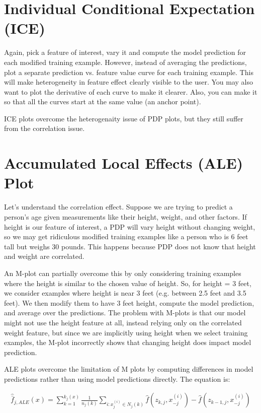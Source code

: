 \documentclass[a4paper]{article}
\begin{document}
\section{Individual Conditional Expectation (ICE)}
Again, pick a feature of interest, vary it and compute the model prediction for
each modified training example. However, instead of averaging the predictions, plot
a separate prediction vs. feature value curve for each training example.
This will make heterogeneity in feature effect clearly visible to the user. You
may also want to plot the derivative of each curve to make it clearer. Also, you
can make it so that all the curves start at the same value (an anchor point).

ICE plots overcome the heterogenaity issue of PDP plots, but they still
suffer from the correlation issue.

\section{Accumulated Local Effects (ALE) Plot}
Let's understand the correlation effect. Suppose we are trying to predict a
person's age given measurements like their height, weight, and other factors.
If height is our feature of interest, a PDP will vary height without changing
weight, so we may get ridiculous modified training examples like a person who is
6 feet tall but weighs 30 pounds. This happens because PDP does not know that
height and weight are correlated.

An M-plot can partially overcome this by only considering training examples
where the height is similar to the chosen value of height. So, for height = 3
feet, we consider examples where height is near 3 feet (e.g. between
2.5 feet and 3.5 feet). We then modify them to have 3 feet height, compute
the model prediction, and average over the predictions. The problem with M-plots
is that our model might not use the height feature at all, instead relying only
on the correlated weight feature, but since we are
implicitly using height when we select training examples, the M-plot incorrectly
shows that changing height does impact model prediction.

ALE plots overcome the limitation of M plots by computing differences in model
predictions rather than using model predictions directly. The equation is:

\begin{align}
  \hat{\bar{f}}_{j, ALE}(x) = \sum_{k=1}^{k_j(x)}{\frac{1}{n_j(k)}
    \sum_{i: x^{(i)}_j \in N_j(k)}{\hat{f}(z_{k, j}, x^{(i)}_{-j}) -
    \hat{f}(z_{k-1,j}, x^{(i)}_{-j})}
  }
\end{align}
\end{document}
